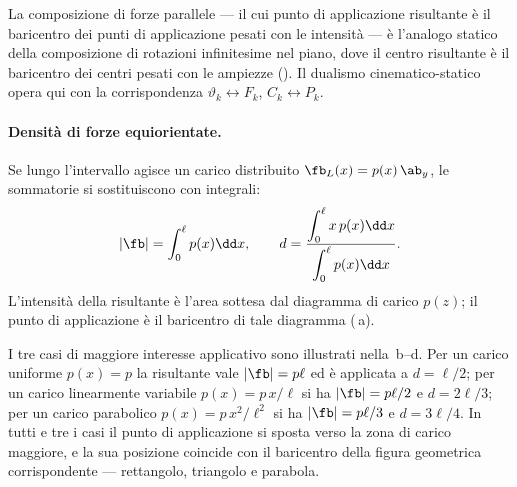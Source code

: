 \begin{oss}
	La composizione di forze parallele --- il cui punto di
	applicazione risultante è il baricentro dei punti di
	applicazione pesati con le intensità --- è l'analogo
	statico della composizione di rotazioni infinitesime nel
	piano, dove il centro risultante è il baricentro dei
	centri pesati con le ampiezze
	(). Il dualismo
	cinematico-statico opera qui con la corrispondenza
	$\vartheta_k \leftrightarrow F_k$, $C_k \leftrightarrow P_k$.
\end{oss}


\paragraph{Densità di forze equiorientate.}
Se lungo l'intervallo agisce un carico distribuito
$\fb_L(x) = p(x)\,\ab_y$, le sommatorie si sostituiscono
con integrali:
\begin{equation}
	|\fb| = \int_0^{\ell} p(x)\dd x, \qquad
	d = \frac{\displaystyle\int_0^{\ell}
		x\,p(x)\dd x}{\displaystyle\int_0^{\ell}
		p(x)\dd x}.
\end{equation}
L'intensità della risultante è l'area sottesa dal diagramma
di carico $p(z)$; il punto di applicazione è il baricentro
di tale diagramma (\,a).

I tre casi di maggiore interesse applicativo sono illustrati
nella \,b--d. Per un carico
uniforme $p(x) = p$ la risultante vale $|\fb| = p\ell$ ed è
applicata a $d = \ell/2$; per un carico linearmente variabile
$p(x) = p\,x/\ell$ si ha $|\fb| = p\ell/2$ e $d = 2\ell/3$;
per un carico parabolico $p(x) = p\,x^2/\ell^2$ si ha
$|\fb| = p\ell/3$ e $d = 3\ell/4$. In tutti e tre i casi il
punto di applicazione si sposta verso la zona di carico
maggiore, e la sua posizione coincide con il baricentro della
figura geometrica corrispondente --- rettangolo, triangolo e
parabola.






























